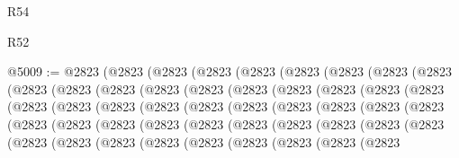 \begin{lexlean}{R54}
\begin{lexlean}{R52}
\begin{coremodule}
{{{{{{{{{{{{{{{{{{{{{{{{{{{{{{{{{{{{{{{{{{{{{{{{{{{{{{{{{{{{{{{{{{{{{{{{{{{{{{{{{{{{{{{{{{{{{{{{{{{{{{{{{{{{{{{{{{{{{{{{{{{{{{{{{{{{{{{{{{{{{{{{{{{{{{{{{{{{{{{{{{{{{{{{{{{{{{{{{{{{{{{{{{{{{{{{{{{{{{@5009 := @2823
    (@2823
      (@2823
        (@2823
          (@2823
            (@2823
              (@2823
                (@2823
                  (@2823
                    (@2823
                      (@2823
                        (@2823
                          (@2823
                            (@2823
                              (@2823
                                (@2823
                                  (@2823
                                    (@2823
                                      (@2823
                                        (@2823
                                          (@2823
                                            (@2823
                                              (@2823
                                                (@2823
                                                  (@2823
                                                    (@2823
                                                      (@2823
                                                        (@2823
                                                          (@2823
                                                            (@2823
                                                              (@2823
                                                                (@2823
                                                                  (@2823
                                                                    (@2823
                                                                      (@2823
                                                                        (@2823
                                                                          (@2823
                                                                            (@2823
                                                                              (@2823
                                                                                (@2823
                                                                                  (@2823
                                                                                    (@2823
                                                                                      (@2823
                                                                                        (@2823
                                                                                          (@2823
                                                                                            (@2823
                                                                                              (@2823
                                                                                                (@2823
}}}}}}}}}}}}}}}}}}}}}}}}}}}}}}}}}}}}}}}}}}}}}}}}}}}}}}}}}}}}}}}}}}}}}}}}}}}}}}}}}}}}}}}}}}}}}}}}}}}}}}}}}}}}}}}}}}}}}}}}}}}}}}}}}}}}}}}}}}}}}}}}}}}}}}}}}}}}}}}}}}}}}}}}}}}}}}}}}}}}}}}}}}}}}}}}}}}}}}
\end{coremodule}
\end{lexlean}
\end{lexlean}
